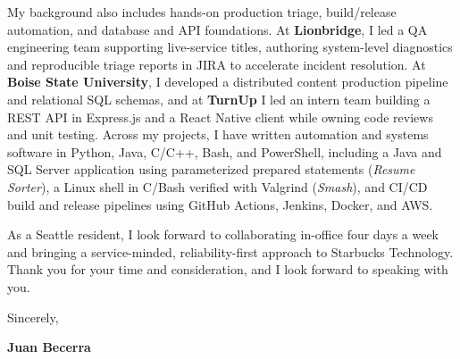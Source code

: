 \documentclass[letterpaper,11pt]{article}
\begin{document}
My background also includes hands-on production triage, build/release automation, and database and API
foundations. At \textbf{Lionbridge}, I led a QA engineering team supporting live-service titles, authoring
system-level diagnostics and reproducible triage reports in JIRA to accelerate incident resolution. At
\textbf{Boise State University}, I developed a distributed content production pipeline and relational SQL
schemas, and at \textbf{TurnUp} I led an intern team building a REST API in Express.js and a React Native
client while owning code reviews and unit testing. Across my projects, I have written automation and systems
software in Python, Java, C/C++, Bash, and PowerShell, including a Java and SQL Server application using
parameterized prepared statements (\emph{Resume Sorter}), a Linux shell in C/Bash verified with Valgrind
(\emph{Smash}), and CI/CD build and release pipelines using GitHub Actions, Jenkins, Docker, and AWS.

As a Seattle resident, I look forward to collaborating in-office four days a week and bringing a
service-minded, reliability-first approach to Starbucks Technology. Thank you for your time and
consideration, and I look forward to speaking with you.

\vspace{10pt}
\noindent Sincerely,

\vspace{14pt}
\noindent \textbf{Juan Becerra}
\end{document}
